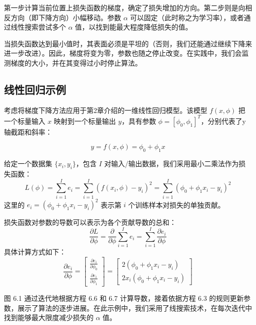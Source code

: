 \documentclass[lang=cn,newtx,10pt,scheme=chinese]{elegantbook}
\begin{document}
第一步计算当前位置上损失函数的梯度，确定了损失增加的方向。第二步则是向相反方向（即下降方向）小幅移动。参数 \(\alpha\) 可以固定（此时称之为学习率），或者通过线性搜索尝试多个 \(\alpha\) 值，以找到能最大程度降低损失的值。

当损失函数达到最小值时，其表面必须是平坦的（否则，我们还能通过继续下降来进一步改进）。因此，梯度将变为零，参数也随之停止改变。在实践中，我们会监测梯度的大小，并在其变得过小时停止算法。

\subsection{线性回归示例}

考虑将梯度下降方法应用于第2章介绍的一维线性回归模型。该模型 \(f(x, \phi)\) 把一个标量输入 \(x\) 映射到一个标量输出 \(y\)，具有参数 \(\phi = [\phi_0, \phi_1]^T\)，分别代表了y轴截距和斜率：

\begin{equation}
y = f(x, \phi) = \phi_0 + \phi_1x 
\end{equation}

给定一个数据集 \(\{x_i, y_i\}\)，包含 \(I\) 对输入/输出数据，我们采用最小二乘法作为损失函数：
\begin{equation}
L(\phi) = \sum_{i=1}^I e_i = \sum_{i=1}^I (f(x_i, \phi) - y_i)^2 = \sum_{i=1}^I (\phi_0 + \phi_1x_i - y_i)^2 
\end{equation}
这里的 \(e_i = (\phi_0 + \phi_1x_i - y_i)^2\) 表示第 \(i\) 个训练样本对损失的单独贡献。

损失函数对参数的导数可以表示为各个贡献导数的总和：
\begin{equation}
\frac{\partial L}{\partial \phi} = \frac{\partial}{\partial \phi} \sum_{i=1}^I e_i = \sum_{i=1}^I \frac{\partial e_i}{\partial \phi} 
\end{equation}
具体计算方式如下：
\begin{equation}
\frac{\partial e_i}{\partial \phi} = 
\begin{bmatrix}
\frac{\partial e_i}{\partial \phi_0}  \\
\frac{\partial e_i}{\partial \phi_1} 
\end{bmatrix} =
\begin{bmatrix}
2(\phi_0 + \phi_1x_i - y_i)  \\
2x_i(\phi_0 + \phi_1x_i - y_i)  
\end{bmatrix} 
\end{equation}

图 6.1 通过迭代地根据方程 6.6 和 6.7 计算导数，接着依据方程 6.3 的规则更新参数，展示了算法的逐步进展。在此示例中，我们采用了线搜索技术，在每次迭代中找到能够最大限度减少损失的 \(\alpha\) 值。
\end{document}
